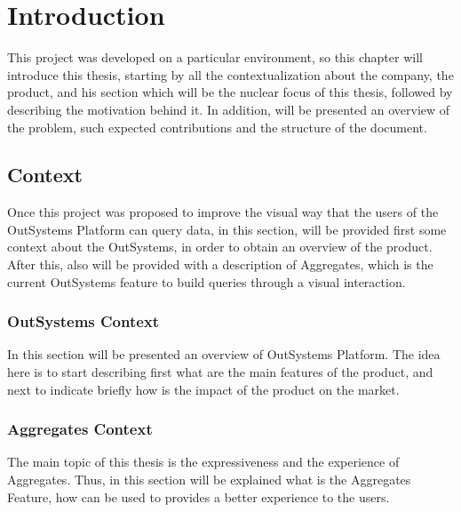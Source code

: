 \newcommand{\novathesis}{\emph{novathesis}}
\newcommand{\novathesisclass}{\texttt{novathesis.cls}}


\chapter{Introduction}
\label{cha:introduction}
This project was developed on a particular environment, so this chapter will 
introduce this thesis, starting by all the contextualization about the company, 
the product, and his section which will be the nuclear focus of this thesis, 
followed by describing the motivation behind it. In addition, will be presented 
an overview of the problem, such expected contributions and the structure of the 
document. 

\section{Context} 
\label{sec:context}
Once this project was proposed to improve the visual way that the users of the 
OutSystems Platform can query data, in this section, will be provided first some 
context about the OutSystems, in order to obtain an overview of the product. 
After this, also will be provided with a description of Aggregates, which is the 
current OutSystems feature to build queries through a visual interaction.

\subsection{OutSystems Context}
\label{subsec:outsystems_context}
In this section will be presented an overview of OutSystems Platform. The idea
here is to start describing first what are the main features of the product, and 
next to indicate briefly how is the impact of the product on the market.

\subsection{Aggregates Context}
\label{subsec:aggregates_context}
The main topic of this thesis is the expressiveness and the experience of 
Aggregates. Thus, in this section will be explained what is the Aggregates Feature, 
how can be used to provides a better experience to the users.

